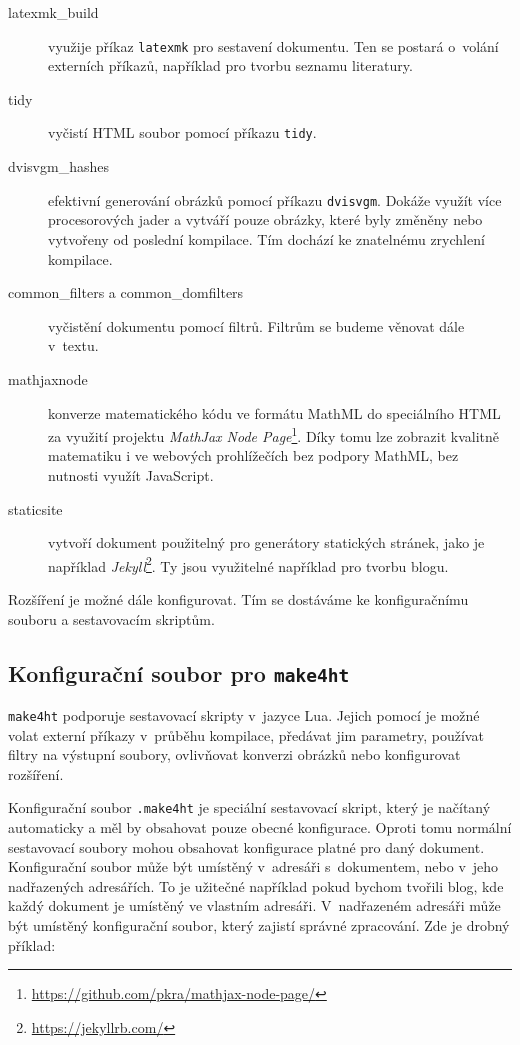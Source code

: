 \documentclass{csbulletin}
\newcommand\nazev[1]{\textit{#1}}
\newcommand\prikaz[1]{\texttt{#1}}
\begin{document}
\begin{description}
  \item[latexmk\_build] využije příkaz \prikaz{latexmk} pro sestavení
    dokumentu. Ten se postará o~volání externích příkazů, například pro tvorbu
    seznamu literatury.
  \item[tidy] vyčistí HTML soubor pomocí příkazu \prikaz{tidy}.
  \item[dvisvgm\_hashes] efektivní generování obrázků pomocí příkazu
    \prikaz{dvisvgm}. Dokáže využít více procesorových jader a vytváří pouze
    obrázky, které byly změněny nebo vytvořeny od poslední kompilace. Tím
    dochází ke znatelnému zrychlení kompilace.
  \item[common\_filters a common\_domfilters] vyčistění dokumentu pomocí filtrů. Filtrům se budeme věnovat dále v~textu.
  \item[mathjaxnode] konverze matematického kódu ve formátu MathML do
    speciálního HTML za využití projektu \nazev{MathJax Node
    Page}\footnote{\url{https://github.com/pkra/mathjax-node-page/}}. Díky tomu
    lze zobrazit kvalitně matematiku i ve webových prohlížečích bez podpory
    MathML, bez nutnosti využít JavaScript.
  \item[staticsite]  vytvoří dokument použitelný pro generátory statických
    stránek, jako je například
    \nazev{Jekyll}\footnote{\url{https://jekyllrb.com/}}. Ty jsou využitelné
    například pro tvorbu blogu.
\end{description}

Rozšíření je možné dále konfigurovat.
Tím se dostáváme ke konfiguračnímu souboru a sestavovacím skriptům.

\subsection{Konfigurační soubor pro \prikaz{make4ht}}

\prikaz{make4ht} podporuje sestavovací skripty v~jazyce Lua. Jejich pomocí je
možné volat externí příkazy v~průběhu kompilace, předávat jim parametry,
používat filtry na výstupní soubory, ovlivňovat konverzi obrázků nebo
konfigurovat rozšíření.

Konfigurační soubor \texttt{.make4ht} je speciální sestavovací skript, který je
načítaný automaticky a měl by obsahovat pouze obecné konfigurace. Oproti tomu
normální sestavovací soubory mohou obsahovat konfigurace platné pro daný
dokument. Konfigurační soubor může být umístěný v~adresáři s~dokumentem, nebo
v~jeho nadřazených adresářích. To je užitečné například pokud bychom tvořili
blog, kde každý dokument je umístěný ve vlastním adresáři. V~nadřazeném
adresáři může být umístěný konfigurační soubor, který zajistí správné
zpracování. Zde je drobný příklad:
\end{document}
